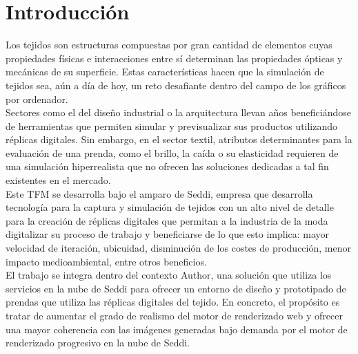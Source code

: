 \chapter{Introducci\'on}
Los tejidos son estructuras compuestas por gran cantidad de elementos cuyas propiedades f\'isicas e interacciones entre s\'i
determinan las propiedades \'opticas y mec\'anicas de su superficie. Estas caracter\'isticas hacen que la simulaci\'on de tejidos
sea, a\'un a d\'ia de hoy, un reto desafiante dentro del campo de los gr\'aficos por ordenador.\\

Sectores como el del dise\~no industrial o la arquitectura llevan a\~nos benefici\'andose de herramientas que permiten
simular y previsualizar sus productos utilizando r\'eplicas digitales. Sin embargo, en el sector textil, atributos determinantes
para la evaluaci\'on de una prenda, como el brillo, la ca\'ida o su elasticidad requieren de una simulaci\'on hiperrealista
que no ofrecen las soluciones dedicadas a tal fin existentes en el mercado.\\

Este TFM se desarrolla bajo el amparo de Seddi, empresa que desarrolla tecnolog\'ia para la captura y simulaci\'on de tejidos
con un alto nivel de detalle para la creaci\'on de r\'eplicas digitales que permitan a la industria de la moda
digitalizar su proceso de trabajo y beneficiarse de lo que esto implica: mayor velocidad de iteraci\'on, ubicuidad, disminuci\'on de
los costes de producci\'on, menor impacto medioambiental, entre otros beneficios.\\

El trabajo se integra dentro del contexto Author, una soluci\'on que utiliza los servicios en la nube de Seddi para ofrecer
un entorno de dise\~no y prototipado de prendas que utiliza las r\'eplicas digitales del tejido. En concreto, el prop\'osito
es tratar de aumentar el grado de realismo del motor de renderizado web y ofrecer una mayor coherencia
con las im\'agenes generadas bajo demanda por el motor de renderizado progresivo en la nube de Seddi.








